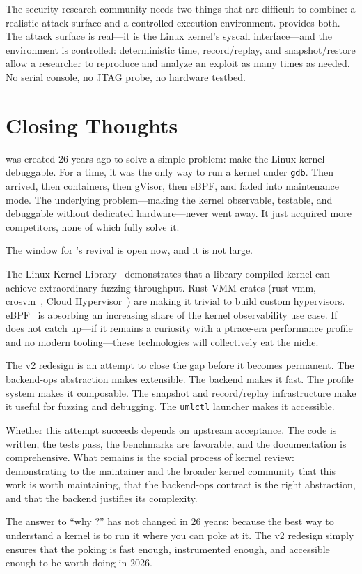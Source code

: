 The security research community needs two things that are difficult
to combine: a realistic attack surface and a controlled execution
environment.  \UML{} provides both.  The attack surface is real---it
is the Linux kernel's syscall interface---and the environment is
controlled: deterministic time, record/replay, and snapshot/restore
allow a researcher to reproduce and analyze an exploit as many times
as needed.  No serial console, no JTAG probe, no hardware testbed.


\section{Closing Thoughts}
\label{sec:conclusion-closing}

\UML{} was created 26 years ago to solve a simple problem: make the
Linux kernel debuggable.  For a time, it was the only way to run a
kernel under \texttt{gdb}.  Then \KVM{} arrived, then containers, then
gVisor, then eBPF, and \UML{} faded into maintenance mode.  The
underlying problem---making the kernel observable, testable, and
debuggable without dedicated hardware---never went away.  It just
acquired more competitors, none of which fully solve it.

The window for \UML{}'s revival is open now, and it is not large.

The Linux Kernel Library~\cite{lkl} demonstrates that a
library-compiled kernel can achieve extraordinary fuzzing throughput.
Rust VMM crates (rust-vmm, crosvm~\cite{crosvm}, Cloud
Hypervisor~\cite{cloud-hypervisor}) are making it trivial to build
custom hypervisors.  eBPF~\cite{ebpf} is absorbing an increasing
share of the kernel observability use case.  If \UML{} does not
catch up---if it remains a curiosity with a ptrace-era performance
profile and no modern tooling---these technologies will collectively
eat the niche.

The v2 redesign is an attempt to close the gap before it becomes
permanent.  The backend-ops abstraction makes \UML{} extensible.
The \KVMvTwo{} backend makes it fast.  The profile system makes it
composable.  The snapshot and record/replay infrastructure make it
useful for fuzzing and debugging.  The \texttt{umlctl} launcher
makes it accessible.

Whether this attempt succeeds depends on upstream acceptance.  The
code is written, the tests pass, the benchmarks are favorable, and
the documentation is comprehensive.  What remains is the social
process of kernel review: demonstrating to the \UML{} maintainer
and the broader kernel community that this work is worth maintaining,
that the backend-ops contract is the right abstraction, and that
the \KVMvTwo{} backend justifies its complexity.

The answer to ``why \UML{}?'' has not changed in 26 years: because
the best way to understand a kernel is to run it where you can poke
at it.  The v2 redesign simply ensures that the poking is fast enough,
instrumented enough, and accessible enough to be worth doing in 2026.
